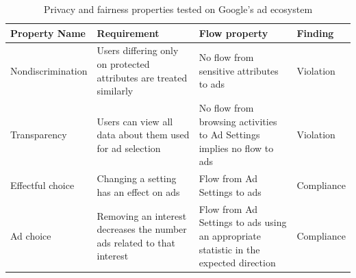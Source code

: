 \documentclass[10pt, onecolumn]{report}
\begin{document}
\begin{table}
\begin{tabular}{lL{5cm}L{5cm}l}
\hline
Property Name & Requirement & Flow property & Finding\\
\hline%
Nondiscrimination & Users differing only on protected attributes are treated similarly 
& No flow from sensitive attributes to ads & Violation\\
Transparency & Users can view all data about them used for ad selection 
& No flow from browsing activities to Ad Settings implies no flow to ads & Violation\\
Effectful choice & Changing a setting has an effect on ads 
& Flow from Ad Settings to ads & Compliance\\
Ad choice & Removing an interest decreases the number ads related to that interest 
& Flow from Ad Settings to ads using an appropriate statistic in the expected direction 
& Compliance\\
\hline
\end{tabular}
\caption{Privacy and fairness properties tested on Google's ad ecosystem}
\label{tbl:properties}
\end{table}
\end{document}

